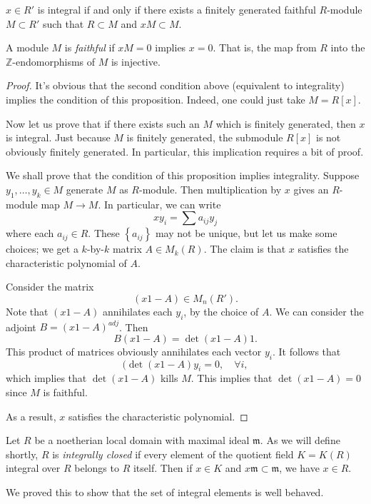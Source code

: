 \begin{proposition} \label{thirdintegralitycriterion}
$x \in R'$ is integral if and only if there exists a
 finitely generated faithful $R$-module $M \subset R'$ such that $R \subset M$ and
 $xM \subset M$.
\end{proposition}
A module $M$ is \emph{faithful} if $x M = 0$ implies $x=0$. That is, the map
from $R$ into the $\mathbb{Z}$-endomorphisms of $M$ is injective.
\begin{proof}
It's obvious that the second condition above (equivalent to integrality)
implies the condition of this
proposition. Indeed, one could just take $M = R[x]$.

Now let us prove that if there exists such an $M$ which is finitely generated,
then $x$ is integral. Just because $M$ is finitely generated, the
submodule $R[x]$ is not obviously finitely generated. In particular, this
implication  requires a bit of proof.


We shall prove that the condition of this proposition implies integrality.
Suppose $y_1, \dots, y_k \in M$ generate $M$ as $R$-module. Then multiplication
by $x$ gives an $R$-module map $M \to M$. In particular, we can write
\[ xy_i = \sum a_{ij} y_j  \]
where each $a_{ij} \in R$.
These $\left\{a_{ij}\right\}$ may not be unique, but let us make some choices;
we get a $k$-by-$k$ matrix $A \in M_k(R)$. The claim is that $x$ satisfies the
characteristic polynomial of $A$.

Consider the matrix
\[ (x 1 - A) \in M_n(R').  \]
Note that $(x1-A)$ annihilates each $y_i$, by the choice of $A$.
We can consider the adjoint $B = (x1  -A)^{adj}$.  Then
\[ B(x1 - A) = \det(x1 - A) 1.  \]
This product of matrices obviously annihilates each vector $y_i$.  It follows
that
\[ (\det(x1 - A) y_i = 0, \quad \forall i,  \]
which implies that $\det (x1-A)$ kills $M$. This implies that $\det (x1 -
A)=0$ since $M$ is faithful.

As a result, $x$ satisfies the characteristic polynomial.
\end{proof}

\begin{exercise}
Let $R$ be a noetherian
local domain with maximal ideal $\mathfrak{m}$. As we will define shortly, $R$
is \emph{integrally closed} if every element of the quotient field $K=K(R)$
integral over $R$ belongs to $R$ itself. Then if $x \in K$ and $x \mathfrak{m}
\subset \mathfrak{m}$, we have $x \in R$.
\end{exercise}


We proved this to show that the set of integral elements is well behaved.

